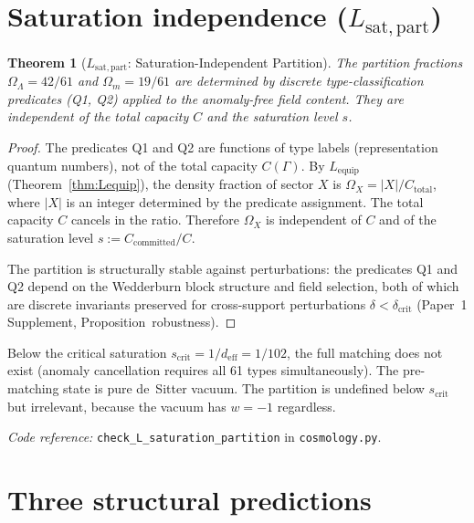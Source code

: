 \documentclass[11pt,a4paper]{article}
\newtheorem{theorem}{Theorem}[section]
\theoremstyle{definition}
\newcommand{\coderef}[2]{\smallskip\noindent\textit{Code reference:} \texttt{#1} in \texttt{#2}.}
\begin{document}
\section{Saturation independence ($L_{\mathrm{sat,part}}$)}
\label{sec:sat_indep}


\begin{theorem}[$L_{\mathrm{sat,part}}$: Saturation-Independent Partition]
\label{thm:sat_part}
The partition fractions $\Omega_\Lambda = 42/61$ and
$\Omega_m = 19/61$ are determined by discrete type-classification
predicates (Q1, Q2) applied to the anomaly-free field content.  They
are independent of the total capacity $C$ and the saturation level $s$.
\end{theorem}

\begin{proof}
The predicates Q1 and Q2 are functions of type labels (representation
quantum numbers), not of the total capacity $C(\Gamma)$.  By
$L_{\mathrm{equip}}$ (Theorem~\ref{thm:Lequip}), the density fraction
of sector $X$ is $\Omega_X = |X|/C_{\mathrm{total}}$, where $|X|$ is
an integer determined by the predicate assignment.  The total capacity
$C$ cancels in the ratio.  Therefore $\Omega_X$ is independent of $C$
and of the saturation level $s := C_{\mathrm{committed}} / C$.

The partition is structurally stable against perturbations: the
predicates Q1 and Q2 depend on the Wedderburn block structure and
field selection, both of which are discrete invariants preserved for
cross-support perturbations $\delta < \delta_{\mathrm{crit}}$
(Paper~1 Supplement, Proposition~robustness).
\end{proof}

\noindent Below the critical saturation $s_{\mathrm{crit}} = 1/d_{\mathrm{eff}}
= 1/102$, the full matching does not exist (anomaly cancellation
requires all 61 types simultaneously).  The pre-matching state is
pure de~Sitter vacuum.  The partition is undefined below
$s_{\mathrm{crit}}$ but irrelevant, because the vacuum has $w = -1$
regardless.

\coderef{check\_L\_saturation\_partition}{cosmology.py}


\section{Three structural predictions}
\label{sec:structural_predictions}
\end{document}
